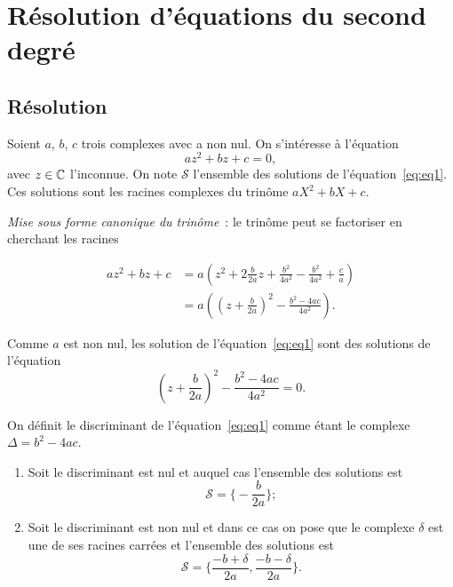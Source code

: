 \section{Résolution d'équations du second degré}\label{sec:resolutionequationseconddegre}

\subsection{Résolution}\label{subsec:resolution}

Soient \(a\), \(b\), \(c\) trois complexes avec a non nul. On s'intéresse à
l'équation
\begin{equation}
  \label{eq:eq1}
  az^2 + bz + c = 0,
\end{equation}
avec \(z \in{}\mathbb{C}\) l'inconnue. On note \(\mathcal{S}\) l'ensemble des solutions
de l'équation~\eqref{eq:eq1}. Ces solutions sont les racines complexes du
trinôme \(aX^2 + bX + c\).

\emph{Mise sous forme canonique du trinôme}~: le trinôme peut se factoriser en
cherchant les racines

\begin{align*}
  az^2 + bz + c & = a \left( z^2+ 2 \frac{b}{2a}z + \frac{b^2}{4a^2} -
  \frac{b^2}{4a^2}  + \frac{c}{a} \right) \\
  & = a \left( {\left( z + \frac{b}{2a} \right)}^2 - \frac{b^2-4ac}{4a^2} \right).
\end{align*}

Comme \(a\) est non nul, les solution de l'équation~\eqref{eq:eq1} sont des
solutions de l'équation
\begin{equation}
  {\left( z + \frac{b}{2a} \right)}^2 - \frac{b^2-4ac}{4a^2} = 0.
\end{equation}

\begin{defdef}
  On définit le discriminant de l'équation~\eqref{eq:eq1} comme étant le
  complexe \(\Delta = b^2-4ac\).
\end{defdef}

\begin{enumerate}
  \item Soit le discriminant est nul et auquel cas l'ensemble des solutions
    est
    \begin{equation}
      \mathcal{S} = \biggl \lbrace-\frac{b}{2a} \biggl \rbrace;
    \end{equation}
  \item Soit le discriminant est non nul et dans ce cas on pose que le
    complexe \(\delta\) est une de ses racines carrées et l'ensemble des
    solutions est
    \begin{equation}
      \mathcal{S} = \biggl \lbrace \frac{-b + \delta}{2a} ,
      \frac{-b-\delta}{2a} \biggl \rbrace.
    \end{equation}
\end{enumerate}

